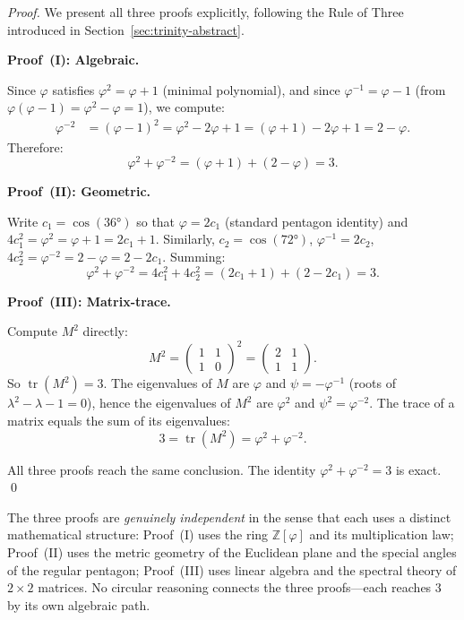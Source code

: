 \begin{proof}
We present all three proofs explicitly, following the Rule of
Three introduced in Section~\ref{sec:trinity-abstract}.

\medskip
\noindent\textbf{Proof~(I): Algebraic.}

Since $\varphi$ satisfies $\varphi^{2}=\varphi+1$ (minimal
polynomial), and since $\varphi^{-1} = \varphi - 1$ (from
$\varphi(\varphi-1)=\varphi^{2}-\varphi=1$), we compute:
\begin{align*}
  \varphi^{-2}
  &= (\varphi-1)^{2}
   = \varphi^{2}-2\varphi+1
   = (\varphi+1)-2\varphi+1
   = 2-\varphi.
\end{align*}
Therefore:
\[
  \varphi^{2}+\varphi^{-2}
  = (\varphi+1)+(2-\varphi)
  = 3.
\]

\medskip
\noindent\textbf{Proof~(II): Geometric.}

Write $c_{1} = \cos(36°)$ so that $\varphi = 2c_{1}$ (standard
pentagon identity) and $4c_{1}^{2} = \varphi^{2} = \varphi+1 = 2c_{1}+1$.
Similarly, $c_{2} = \cos(72°)$, $\varphi^{-1} = 2c_{2}$,
$4c_{2}^{2} = \varphi^{-2} = 2-\varphi = 2-2c_{1}$.
Summing:
\[
  \varphi^{2}+\varphi^{-2}
  = 4c_{1}^{2}+4c_{2}^{2}
  = (2c_{1}+1)+(2-2c_{1})
  = 3.
\]

\medskip
\noindent\textbf{Proof~(III): Matrix-trace.}

Compute $M^{2}$ directly:
\[
  M^{2}
  = \begin{pmatrix}1&1\\1&0\end{pmatrix}^{2}
  = \begin{pmatrix}2&1\\1&1\end{pmatrix}.
\]
So $\operatorname{tr}(M^{2})=3$.
The eigenvalues of $M$ are $\varphi$ and $\psi=-\varphi^{-1}$
(roots of $\lambda^{2}-\lambda-1=0$), hence the eigenvalues of
$M^{2}$ are $\varphi^{2}$ and $\psi^{2}=\varphi^{-2}$.
The trace of a matrix equals the sum of its eigenvalues:
\[
  3 = \operatorname{tr}(M^{2}) = \varphi^{2}+\varphi^{-2}.
\]

\medskip
All three proofs reach the same conclusion.
The identity $\varphi^{2}+\varphi^{-2}=3$ is exact.
\qed
\end{proof}

\begin{remark}
The three proofs are \emph{genuinely independent} in the sense
that each uses a distinct mathematical structure:
Proof~(I) uses the ring $\mathbb{Z}[\varphi]$ and its
multiplication law;
Proof~(II) uses the metric geometry of the Euclidean plane and
the special angles of the regular pentagon;
Proof~(III) uses linear algebra and the spectral theory of
$2 \times 2$ matrices.
No circular reasoning connects the three proofs---each reaches
$3$ by its own algebraic path.
\end{remark}

